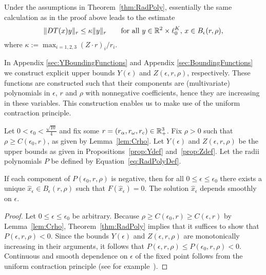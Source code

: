 \begin{remark}\label{r:boundDT}
Under the assumptions in Theorem~\ref{thm:RadPoly},
essentially the same calculation as in the proof above
leads to the estimate
\[
  \| DT(x) y \|_r \leq \kappa \|y\|_r 
  \qquad \text{for all } y \in \mathbb{R}^2 \times \ell^K_0 , 
  \, x \in B_\epsilon(r,\rho),
\]
where $\kappa := \max_{i=1,2,3} (Z\cdot r)_i / r_i$.
\end{remark}


In Appendix \ref{sec:YBoundingFunctions} and Appendix \ref{sec:BoundingFunctions} we construct explicit upper bounds 
$Y(\epsilon)$ and $ Z(\epsilon,r,\rho)$, respectively.  
These functions are constructed such that their components are (multivariate) polynomials in $\epsilon$, $r$ and $ \rho$ with nonnegative coefficients, hence they are increasing in these variables. 
This construction enables us to make use of the uniform contraction principle. 

\begin{corollary}\label{cor:eps0}
Let 
 $0 < \epsilon_0 < \tfrac{\sqrt{10}}{4} $ 
and fix some $r = (r_\alpha, r_\omega, r_c) \in \mathbb{R}^3_+$.  
Fix $\rho > 0$ such that $ \rho \geq C(\epsilon_0,  r)$, as given by Lemma~\ref{lem:Crho}.
%
Let $Y(\epsilon)$ and $Z(\epsilon,r,\rho)$ be the upper bounds as given in  Propositions~\ref{prop:Ydef} and~\ref{prop:Zdef}. 
Let the radii polynomials $P$ be defined by Equation~\eqref{eq:RadPolyDef}.


If each component of  $P(\epsilon_0, r,\rho)$ is negative, 
then for all $ 0 \leq \epsilon \leq \epsilon_0$ there exists a unique $ \hat{x}_\epsilon \in B_\epsilon(  r , \rho)$ such that $ F(\hat{x}_\epsilon) =0$.  
The solution $\hat{x}_\epsilon$ depends smoothly on $\epsilon$.
\end{corollary}
\begin{proof} 
	Let $0 \leq  \epsilon \leq \epsilon_0$ be arbitrary.
	Because $\rho \geq C(\epsilon_0, r) \geq C(\epsilon, r)$ by Lemma~\ref{lem:Crho},
	Theorem~\ref{thm:RadPoly} implies that it suffices to show that $ P(\epsilon, r ,\rho) <0$. 	
Since  the bounds 
$Y(\epsilon)$ and $ Z(\epsilon,r,\rho)$ are monotonically increasing in their arguments, it follows that $ P(\epsilon,r,\rho) \leq P(\epsilon_0,r,\rho) <0$.  
Continuous and smooth dependence on $\epsilon$ of the fixed point follows from the uniform contraction principle (see for example~\cite{ChowHale}). 
\end{proof}


